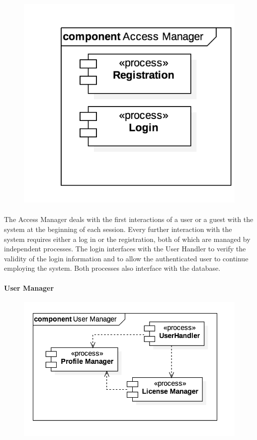 			\begin{figure}[h]
				\includegraphics[scale=0.4, center]{img/component_diagrams/02_access_manager.png}
			\end{figure}
			
		\paragraph{}The Access Manager deals with the first interactions of a user or a guest with the system at the beginning of each session. Every further interaction with the system requires either a log in or the registration, both of which are managed by independent processes. The login interfaces with the User Handler to verify the validity of the login information and to allow the authenticated user to continue employing the system. Both processes also interface with the database.
		
		
		
		
		\paragraph{User Manager}
		
			\begin{figure}[h]
				\includegraphics[scale=0.4, center]{img/component_diagrams/03_user_manager.png}
			\end{figure}
			
		\paragraph{}